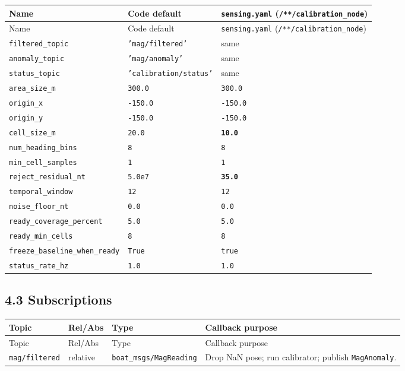 \begin{center}
\small
\begin{longtable}{@{}llp{7.2cm}@{}}
\toprule
Name & Code default & \texttt{sensing.yaml} (\texttt{/**/calibration\_node}) \\
\midrule
\endfirsthead
\toprule
Name & Code default & \texttt{sensing.yaml} (\texttt{/**/calibration\_node}) \\
\midrule
\endhead
\texttt{filtered\_topic} & \texttt{'mag/filtered'} & same \\
\texttt{anomaly\_topic} & \texttt{'mag/anomaly'} & same \\
\texttt{status\_topic} & \texttt{'calibration/status'} & same \\
\texttt{area\_size\_m} & \texttt{300.0} & \texttt{300.0} \\
\texttt{origin\_x} & \texttt{-150.0} & \texttt{-150.0} \\
\texttt{origin\_y} & \texttt{-150.0} & \texttt{-150.0} \\
\texttt{cell\_size\_m} & \texttt{20.0} & \textbf{\texttt{10.0}} \\
\texttt{num\_heading\_bins} & \texttt{8} & \texttt{8} \\
\texttt{min\_cell\_samples} & \texttt{1} & \texttt{1} \\
\texttt{reject\_residual\_nt} & \texttt{5.0e7} & \textbf{\texttt{35.0}} \\
\texttt{temporal\_window} & \texttt{12} & \texttt{12} \\
\texttt{noise\_floor\_nt} & \texttt{0.0} & \texttt{0.0} \\
\texttt{ready\_coverage\_percent} & \texttt{5.0} & \texttt{5.0} \\
\texttt{ready\_min\_cells} & \texttt{8} & \texttt{8} \\
\texttt{freeze\_baseline\_when\_ready} & \texttt{True} & \texttt{true} \\
\texttt{status\_rate\_hz} & \texttt{1.0} & \texttt{1.0} \\
\bottomrule
\end{longtable}
\end{center}


\subsection{4.3 Subscriptions}


\begin{center}
\small
\begin{longtable}{@{}lllp{5.2cm}@{}}
\toprule
Topic & Rel/Abs & Type & Callback purpose \\
\midrule
\endfirsthead
\toprule
Topic & Rel/Abs & Type & Callback purpose \\
\midrule
\endhead
\texttt{mag/filtered} & relative & \texttt{boat\_msgs/MagReading} & Drop NaN pose; run calibrator; publish \texttt{MagAnomaly}. \\
\bottomrule
\end{longtable}
\end{center}


